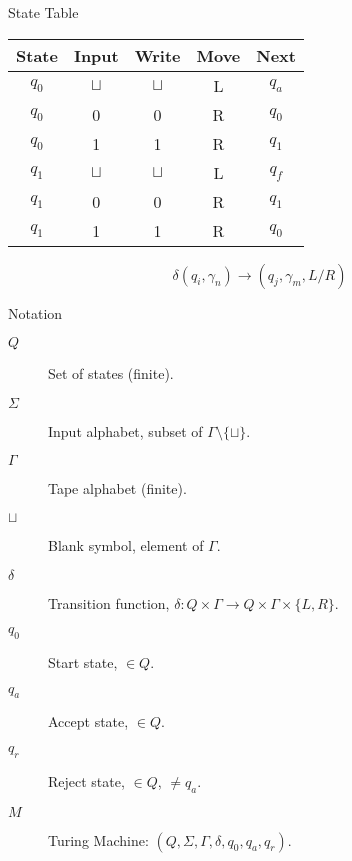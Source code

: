 \begin{frame}{State Table}
  \begin{table}
    \centering
    \begin{tabular}{cc|ccc}
    \toprule
        State & Input & Write & Move & Next \\
    \midrule
        $q_0$ & $\sqcup$ & $\sqcup$ & L & $q_a$ \\
        $q_0$ & 0 & 0 & R & $q_0$ \\
        $q_0$ & 1 & 1 & R & $q_1$ \\
    \midrule
        $q_1$ & $\sqcup$ & $\sqcup$ & L & $q_f$ \\
        $q_1$ & 0 & 0 & R & $q_1$ \\
        $q_1$ & 1 & 1 & R & $q_0$ \\
    \bottomrule
    \end{tabular}
  \end{table}
  

  \[ \delta(q_i, \gamma_n) \rightarrow (q_j, \gamma_m, L/R) \]
\end{frame}



\begin{frame}{Notation}
\begin{description}
  \item[$Q$] Set of states (finite).
  \item[$\Sigma$] Input alphabet, subset of $\Gamma \setminus \{ \sqcup \} $.
  \item[$\Gamma$] Tape alphabet (finite).
  \item[$\sqcup$] Blank symbol, element of $\Gamma$.
  \item[$\delta$] Transition function, $\delta: Q \times \Gamma \rightarrow Q \times \Gamma \times \{L,R\}$.
  \item[$q_0$] Start state, $\in Q$.
  \item[$q_a$] Accept state, $\in Q$.
  \item[$q_r$] Reject state, $\in Q$, $\neq q_a$.
  \vspace{0.3cm}
  \item[$M$] Turing Machine: $(Q, \Sigma, \Gamma, \delta , q_0, q_a, q_r )$.
\end{description}
\end{frame}


